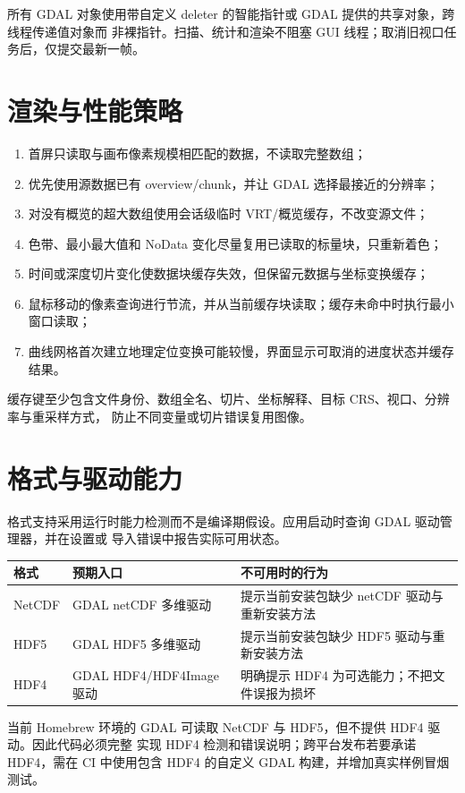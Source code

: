 \documentclass[UTF8,fontset=fandol,11pt]{ctexart}
\begin{document}
所有 GDAL 对象使用带自定义 deleter 的智能指针或 GDAL 提供的共享对象，跨线程传递值对象而
非裸指针。扫描、统计和渲染不阻塞 GUI 线程；取消旧视口任务后，仅提交最新一帧。

\section{渲染与性能策略}

\begin{enumerate}
  \item 首屏只读取与画布像素规模相匹配的数据，不读取完整数组；
  \item 优先使用源数据已有 overview/chunk，并让 GDAL 选择最接近的分辨率；
  \item 对没有概览的超大数组使用会话级临时 VRT/概览缓存，不改变源文件；
  \item 色带、最小最大值和 NoData 变化尽量复用已读取的标量块，只重新着色；
  \item 时间或深度切片变化使数据块缓存失效，但保留元数据与坐标变换缓存；
  \item 鼠标移动的像素查询进行节流，并从当前缓存块读取；缓存未命中时执行最小窗口读取；
  \item 曲线网格首次建立地理定位变换可能较慢，界面显示可取消的进度状态并缓存结果。
\end{enumerate}

缓存键至少包含文件身份、数组全名、切片、坐标解释、目标 CRS、视口、分辨率与重采样方式，
防止不同变量或切片错误复用图像。

\section{格式与驱动能力}

格式支持采用运行时能力检测而不是编译期假设。应用启动时查询 GDAL 驱动管理器，并在设置或
导入错误中报告实际可用状态。

\begin{tabularx}{\textwidth}{lXX}
\toprule
格式 & 预期入口 & 不可用时的行为 \\
\midrule
NetCDF & GDAL netCDF 多维驱动 & 提示当前安装包缺少 netCDF 驱动与重新安装方法 \\
HDF5 & GDAL HDF5 多维驱动 & 提示当前安装包缺少 HDF5 驱动与重新安装方法 \\
HDF4 & GDAL HDF4/HDF4Image 驱动 & 明确提示 HDF4 为可选能力；不把文件误报为损坏 \\
\bottomrule
\end{tabularx}

当前 Homebrew 环境的 GDAL 可读取 NetCDF 与 HDF5，但不提供 HDF4 驱动。因此代码必须完整
实现 HDF4 检测和错误说明；跨平台发布若要承诺 HDF4，需在 CI 中使用包含 HDF4 的自定义
GDAL 构建，并增加真实样例冒烟测试。
\end{document}
